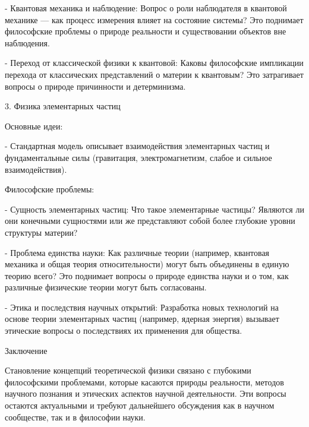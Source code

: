 \documentclass[exam_answers.tex]{subfiles}
\begin{document}
- Квантовая механика и наблюдение: Вопрос о роли наблюдателя в квантовой механике — как процесс измерения влияет на состояние системы? Это поднимает философские проблемы о природе реальности и существовании объектов вне наблюдения.

- Переход от классической физики к квантовой: Каковы философские импликации перехода от классических представлений о материи к квантовым? Это затрагивает вопросы о природе причинности и детерминизма.

3. Физика элементарных частиц

Основные идеи:

- Стандартная модель описывает взаимодействия элементарных частиц и фундаментальные силы (гравитация, электромагнетизм, слабое и сильное взаимодействия).

Философские проблемы:

- Сущность элементарных частиц: Что такое элементарные частицы? Являются ли они конечными сущностями или же представляют собой более глубокие уровни структуры материи?

- Проблема единства науки: Как различные теории (например, квантовая механика и общая теория относительности) могут быть объединены в единую теорию всего? Это поднимает вопросы о природе единства науки и о том, как различные физические теории могут быть согласованы.

- Этика и последствия научных открытий: Разработка новых технологий на основе теории элементарных частиц (например, ядерная энергия) вызывает этические вопросы о последствиях их применения для общества.

Заключение

Становление концепций теоретической физики связано с глубокими философскими проблемами, которые касаются природы реальности, методов научного познания и этических аспектов научной деятельности.
Эти вопросы остаются актуальными и требуют дальнейшего обсуждения как в научном сообществе, так и в философии науки.
\end{document}

